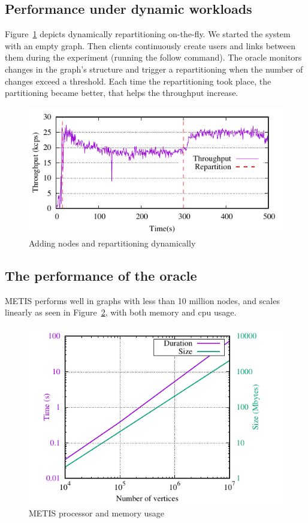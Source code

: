 \subsection{Performance under dynamic workloads}

Figure~\ref{fig:dynamic_load_tput} depicts dynamically repartitioning
on-the-fly.  We started the system with an empty graph. Then clients
continuously create users and links between them during the experiment
(running the follow command).  The oracle monitors changes in the
graph's structure and trigger a repartitioning when the number of
changes exceed a threshold.  Each time the repartitioning took place,
the partitioning became better, that helps the throughput increase.

\begin{figure}[ht]
	\includegraphics{figures/experiments/dynamicload-tp-move-4p}
	\caption{Adding nodes and repartitioning dynamically}
	\label{fig:dynamic_load_tput}
\end{figure}

\subsection{The performance of the oracle}

METIS performs well in graphs with less than 10 million nodes, and
scales linearly as seen in Figure~\ref{fig:metis_size_time}, with both
memory and cpu usage.

\begin{figure}[ht!]
  \centering
    \includegraphics[width=\columnwidth]{figures/metis_size_time}
	\caption{METIS processor and memory usage}
	\label{fig:metis_size_time}
\end{figure}

